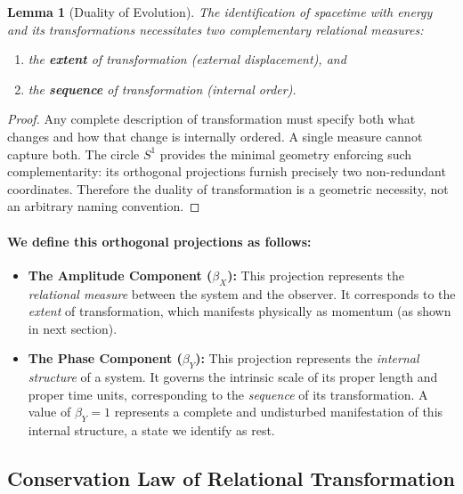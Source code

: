 \documentclass[12pt, a4paper]{article}
\newtheorem{lemma}[theorem]{Lemma}
\begin{document}
\begin{lemma}[Duality of Evolution]
\label{lem:duality}
The identification of spacetime with energy and its transformations necessitates two complementary relational measures:
\begin{enumerate}
    \item the \textbf{extent} of transformation (external displacement), and
    \item the \textbf{sequence} of transformation (internal order).
\end{enumerate}
\end{lemma}

\begin{proof}
Any complete description of transformation must specify both what changes and how that change is internally ordered. A single measure cannot capture both. The circle $S^1$ provides the minimal geometry enforcing such complementarity: its orthogonal projections furnish precisely two non-redundant coordinates. Therefore the duality of transformation is a geometric necessity, not an arbitrary naming convention. 
\end{proof}

\paragraph{ We define this orthogonal projections as follows:}

\begin{itemize}

    \item \textbf{The Amplitude Component ($\beta_X$):} This projection represents the \textit{relational measure} between the system and the observer. It corresponds to the \textit{extent} of transformation, which manifests physically as momentum (as shown in next section).

    \item \textbf{The Phase Component ($\beta_Y$):} This projection represents the \textit{internal structure} of a system. It governs the intrinsic scale of its proper length and proper time units, corresponding to the \textit{sequence} of its transformation. A value of $\beta_Y=1$ represents a complete and undisturbed manifestation of this internal structure, a state we identify as rest.


\end{itemize}

\subsection{Conservation Law of Relational Transformation}
\end{document}
